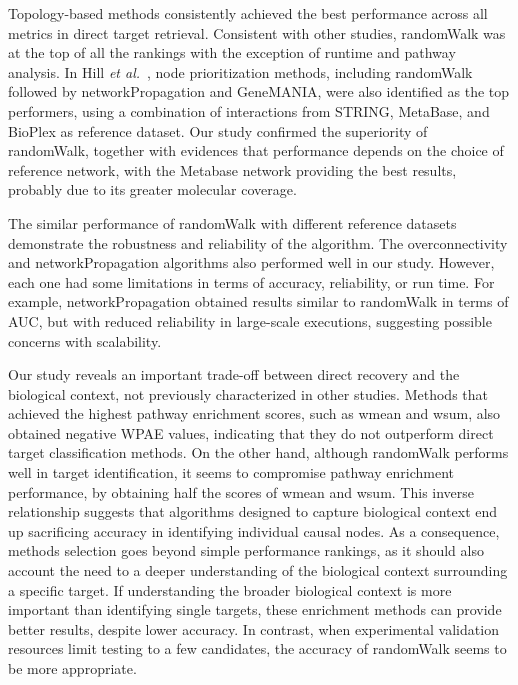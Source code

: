 Topology-based methods consistently achieved the best performance across all metrics in direct target retrieval. 
Consistent with other studies, randomWalk was at the top of all the rankings with the exception of runtime and pathway analysis.
In Hill \textit{et al.}~\cite{RN37}, node prioritization methods, including randomWalk followed by networkPropagation and GeneMANIA, were also identified as the top performers, using a combination of interactions from STRING, MetaBase, and BioPlex as reference dataset. 
Our study confirmed the superiority of randomWalk, together with evidences that performance depends on the choice of reference network, with the Metabase network providing the best results, probably due to its greater molecular coverage.

The similar performance of randomWalk with different reference datasets demonstrate the robustness and reliability of the algorithm. 
The overconnectivity and networkPropagation algorithms also performed well in our study. 
However, each one had some limitations in terms of accuracy, reliability, or run time. 
For example, networkPropagation obtained results similar to randomWalk in terms of \gls{AUC}, but with reduced reliability in large-scale executions, suggesting possible concerns with scalability.

Our study reveals an important trade-off between direct recovery and the biological context, not previously characterized in other studies. 
Methods that achieved the highest pathway enrichment scores, such as wmean and wsum, also obtained negative \gls{WPAE} values, indicating that they do not outperform direct target classification methods. 
On the other hand, although randomWalk performs well in target identification, it seems to compromise pathway enrichment performance, by obtaining half the scores of wmean and wsum. 
This inverse relationship suggests that algorithms designed to capture biological context end up sacrificing accuracy in identifying individual causal nodes. 
As a consequence, methods selection goes beyond simple performance rankings, as it should also account the need to a deeper understanding of the biological context surrounding a specific target. 
If understanding the broader biological context is more important than identifying single targets, these enrichment methods can provide better results, despite lower accuracy. 
In contrast, when experimental validation resources limit testing to a few candidates, the accuracy of randomWalk seems to be more appropriate.

